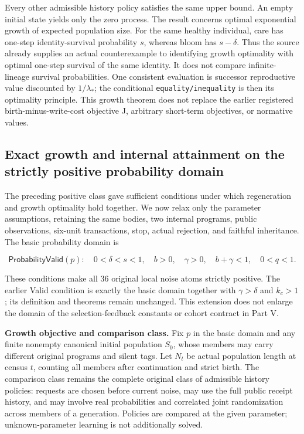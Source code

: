 \documentclass[
  english,
  11pt,
  oneside]{book}
\newcounter{none} %
\begin{document}
Every other admissible history policy satisfies the same upper bound. An empty initial state yields only the zero process. The result concerns optimal exponential growth of expected population size. For the same healthy individual, care has one-step identity-survival probability \(s\), whereas bloom has \(s-\delta\). Thus the source already supplies an actual counterexample to identifying growth optimality with optimal one-step survival of the same identity. It does not compare infinite-lineage survival probabilities. One consistent evaluation is successor reproductive value discounted by \(1/\lambda_*\); the conditional \nolinkurl{equality/inequality} is then its optimality principle. This growth theorem does not replace the earlier registered birth-minus-write-cost objective J, arbitrary short-term objectives, or normative values.

\subsection{Exact growth and internal attainment on the strictly positive probability domain}\label{core-growth-classification}

The preceding positive class gave sufficient conditions under which regeneration and growth optimality hold together. We now relax only the parameter assumptions, retaining the same bodies, two internal programs, public observations, six-unit transactions, stop, actual rejection, and faithful inheritance. The basic probability domain is

\[\mathsf{ProbabilityValid}(p):\quad
0<\delta<s<1,\quad b>0,\quad \gamma>0,\quad
b+\gamma<1,\quad 0<q<1.\]

These conditions make all 36 original local noise atoms strictly positive. The earlier Valid condition is exactly the basic domain together with \(\gamma>\delta\) and \(k_c>1\); its definition and theorems remain unchanged. This extension does not enlarge the domain of the selection-feedback constants or cohort contract in Part V.

\textbf{Growth objective and comparison class.} Fix \(p\) in the basic domain and any finite nonempty canonical initial population \(S_0\), whose members may carry different original programs and silent tags. Let \(N_t\) be actual population length at census \(t\), counting all members after continuation and strict birth. The comparison class remains the complete original class of admissible history policies: requests are chosen before current noise, may use the full public receipt history, and may involve real probabilities and correlated joint randomization across members of a generation. Policies are compared at the given parameter; unknown-parameter learning is not additionally solved.
\end{document}
